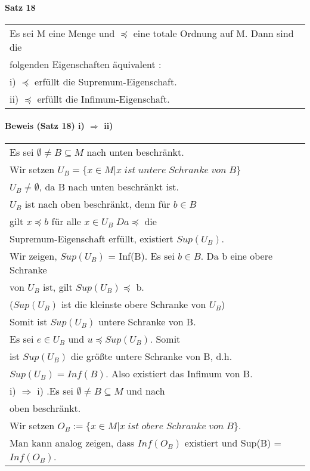 \documentclass[a4paper]{scrartcl}
\begin{document}
\paragraph{Satz 18}
\begin{tabbing}
\begin{tabular}{l}
Es sei M eine Menge und $ \preceq $ eine totale Ordnung auf M. Dann sind die\\
folgenden Eigenschaften äquivalent : \\
i) $ \preceq $ erfüllt die Supremum-Eigenschaft.\\
ii) $ \preceq $ erfüllt die Infimum-Eigenschaft.
\end{tabular}
\end{tabbing}

\paragraph{Beweis (Satz 18) i) $ \Rightarrow $ ii)}
\begin{tabbing}
\begin{tabular}{l}
Es sei $ \emptyset \neq B \subseteq M $ nach unten beschränkt.\\
Wir setzen $ U_B = \{ x \in M | x\;ist\;untere\;Schranke\;von\;B \} $ \\ 
$ U_B  \neq \emptyset $, da B nach unten beschränkt ist.\\
$ U_B $ ist nach oben beschränkt, denn für $ b\in B $ \\
gilt $ x \preceq b $ für alle $ x\in U_B \; Da \preceq $ die \\
Supremum-Eigenschaft erfüllt, existiert $ Sup(U_B)$.\\
Wir zeigen, $Sup(U_B)$ = Inf(B). Es sei $ b\in B $. Da b eine obere Schranke\\
von $U_B$ ist, gilt $Sup(U_B) \preceq $ b.\\
($Sup(U_B)$ ist die kleinste obere Schranke von $ U_B $)\\
Somit ist $Sup(U_B)$ untere Schranke von B.\\
Es sei $ e\in U_B $ und $ u \preceq Sup(U_B) $. Somit\\
ist $Sup(U_B)$ die größte untere Schranke von B, d.h.\\
$Sup(U_B) = Inf(B)$. Also existiert das Infimum von B.\\
i) $ \Rightarrow $ i) .Es sei $ \emptyset \neq B \subseteq M $ und nach \\
oben beschränkt.\\
Wir setzen $ O_B :=\{ x\in M | x\;ist\;obere\;Schranke\;von\;B \}$.\\
Man kann analog zeigen, dass $Inf(O_B)$ existiert und Sup(B) = $Inf(O_B)$. 
\end{tabular}
\end{tabbing}
\end{document}
